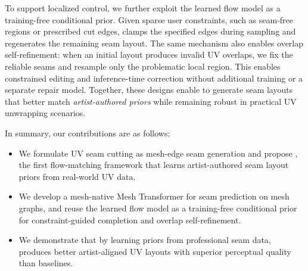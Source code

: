 To support localized control, we further exploit the learned flow model as a training-free conditional prior. 
Given sparse user constraints, such as seam-free regions or prescribed cut edges, \methodname{} clamps the specified edges during sampling and regenerates the remaining seam layout. 
The same mechanism also enables overlap self-refinement: when an initial layout produces invalid UV overlaps, we fix the reliable seams and resample only the problematic local region. 
This enables constrained editing and inference-time correction without additional training or a separate repair model.
Together, these designs enable \methodname{} to generate seam layouts that better match \textit{artist-authored priors} while remaining robust in practical UV unwrapping scenarios.

In summary, our contributions are as follows:
\begin{itemize}
    \item We formulate UV seam cutting as mesh-edge seam generation and propose \methodname{}, the first flow-matching framework that learns artist-authored seam layout priors from real-world UV data.
    \item We develop a mesh-native Mesh Transformer for seam prediction on mesh graphs, and reuse the learned flow model as a training-free conditional prior for constraint-guided completion and overlap self-refinement.
    \item We demonstrate that by learning priors from professional seam  data, \methodname{} produces better artist-aligned UV layouts with superior perceptual quality than baselines.
\end{itemize}
